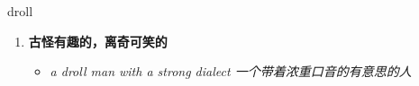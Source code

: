 
\begin{frame}
{\huge droll}
\begin{center}
\begin{enumerate}\Large
  \item \textbf{古怪有趣的，离奇可笑的}
  \begin{itemize}
    \item \em{\Large{a droll man with a strong dialect 一个带着浓重口音的有意思的人}}
  \end{itemize}
\end{enumerate}
\end{center}
\end{frame}
